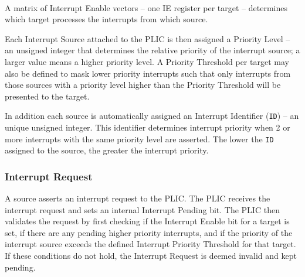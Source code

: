\paragraph{}

A matrix of Interrupt Enable vectors -- one IE register per target --
determines which target processes the interrupts from which source.

Each Interrupt Source attached to the PLIC is then assigned a Priority
Level -- an unsigned integer that determines the relative priority of
the interrupt source; a larger value means a higher priority
level. A Priority Threshold per target may also be defined to mask lower
priority interrupts such that only interrupts from those sources with a 
priority level higher than the Priority Threshold will be presented to the target.

In addition each source is automatically assigned an Interrupt Identifier
(\texttt{ID}) -- an unique unsigned integer. This identifier determines
interrupt priority when 2 or more interrupts with the same priority
level are asserted. The lower the \texttt{ID} assigned to the source,
the greater the interrupt priority.

\subsubsection{Interrupt Request}

A source asserts an interrupt request to the PLIC. The PLIC receives the interrupt request and sets an internal Interrupt Pending bit. The PLIC then validates the request by first checking if the Interrupt Enable bit for a target is set, if there are any pending higher priority interrupts, and if the priority of the interrupt source exceeds the defined Interrupt Priority Threshold for that target. If these conditions do not hold, the Interrupt Request is deemed invalid and kept pending.

